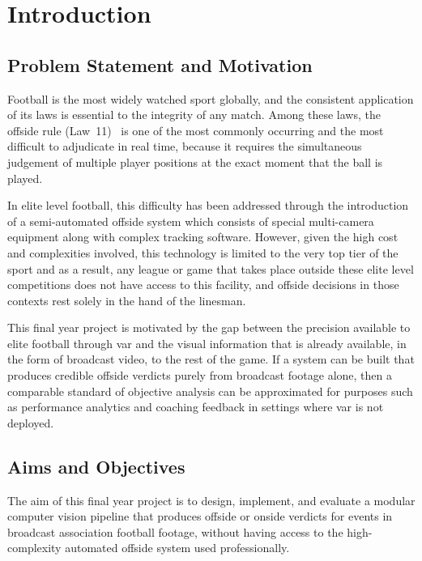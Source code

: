 \chapter{Introduction}%
\label{chp:introduction}

\section{Problem Statement and Motivation}%
\label{sec:intro_motivation}

Football is the most widely watched sport globally, and the consistent application of its laws is essential to the integrity of any match. Among these laws, the offside rule (Law~11)~\cite{ifab2023laws} is one of the most commonly occurring and the most difficult to adjudicate in real time, because it requires the simultaneous judgement of multiple player positions at the exact moment that the ball is played.

In elite level football, this difficulty has been addressed through the introduction of a semi-automated offside system which consists of special multi-camera equipment along with complex tracking software. However, given the high cost and complexities involved, this technology is limited to the very top tier of the sport and as a result, any league or game that takes place outside these elite level competitions does not have access to this facility, and offside decisions in those contexts rest solely in the hand of the linesman.

This final year project is motivated by the gap between the precision available to elite football through \gls{var} and the visual information that is already available, in the form of broadcast video, to the rest of the game. If a system can be built that produces credible offside verdicts purely from broadcast footage alone, then a comparable standard of objective analysis can be approximated for purposes such as performance analytics and coaching feedback in settings where \gls{var} is not deployed.

\section{Aims and Objectives}%
\label{sec:intro_aims}

The aim of this final year project is to design, implement, and evaluate a modular computer vision pipeline that produces offside or onside verdicts for events in broadcast association football footage, without having access to the high-complexity automated offside system used professionally.


